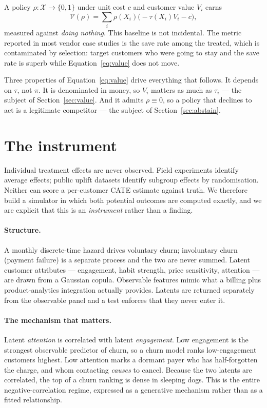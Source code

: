 \documentclass[11pt,a4paper]{article}
\newcommand{\CATE}{\tau}
\begin{document}
A policy $\rho: \mathcal{X} \to \{0,1\}$ under unit cost $c$ and customer value $V_i$
earns
\begin{equation}
  \label{eq:value}
  \mathcal{V}(\rho) = \sum_i \rho(X_i)\bigl(-\CATE(X_i) V_i - c\bigr),
\end{equation}
measured against \emph{doing nothing}. This baseline is not incidental. The metric
reported in most vendor case studies is the save rate among the treated, which is
contaminated by selection: target customers who were going to stay and the save rate
is superb while Equation~\eqref{eq:value} does not move.

Three properties of Equation~\eqref{eq:value} drive everything that follows. It
depends on $\CATE$, not $\pi$. It is denominated in money, so $V_i$ matters as much
as $\CATE_i$ --- the subject of Section~\ref{sec:value}. And it admits
$\rho \equiv 0$, so a policy that declines to act is a legitimate competitor ---
the subject of Section~\ref{sec:abstain}.

\section{The instrument}
\label{sec:instrument}

Individual treatment effects are never observed. Field experiments identify average
effects; public uplift datasets identify subgroup effects by randomisation. Neither
can score a per-customer CATE estimate against truth. We therefore build a simulator
in which both potential outcomes are computed exactly, and we are explicit that this
is an \emph{instrument} rather than a finding.

\paragraph{Structure.} A monthly discrete-time hazard drives voluntary churn;
involuntary churn (payment failure) is a separate process and the two are never
summed. Latent customer attributes --- engagement, habit strength, price
sensitivity, attention --- are drawn from a Gaussian copula. Observable features
mimic what a billing plus product-analytics integration actually provides. Latents
are returned separately from the observable panel and a test enforces that they
never enter it.

\paragraph{The mechanism that matters.} Latent \emph{attention} is correlated with
latent \emph{engagement}. Low engagement is the strongest observable predictor of
churn, so a churn model ranks low-engagement customers highest. Low attention marks
a dormant payer who has half-forgotten the charge, and whom contacting \emph{causes}
to cancel. Because the two latents are correlated, the top of a churn ranking is
dense in sleeping dogs. This is the entire negative-correlation regime, expressed as
a generative mechanism rather than as a fitted relationship.
\end{document}

